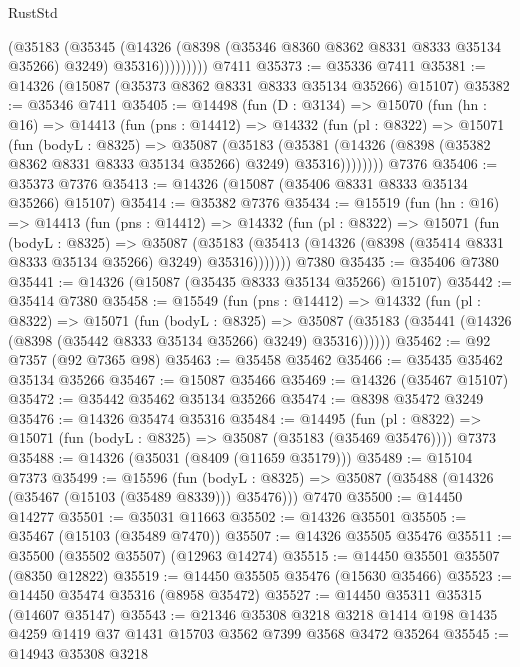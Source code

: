 \begin{lexlean}{RustStd}
\begin{coremodule}
                (@35183
                  (@35345
                    (@14326
                      (@8398 (@35346 @8360 @8362 @8331 @8333 @35134 @35266) @3249)
                      @35316)))))))))
    @7411
@35373 := @35336 @7411
@35381 := @14326 (@15087 (@35373 @8362 @8331 @8333 @35134 @35266) @15107)
@35382 := @35346 @7411
@35405 := @14498
    (fun (D : @3134) =>
    @15070
      (fun (hn : @16) =>
      @14413
        (fun (pns : @14412) =>
        @14332
          (fun (pl : @8322) =>
          @15071
            (fun (bodyL : @8325) =>
            @35087
              (@35183
                (@35381
                  (@14326 (@8398 (@35382 @8362 @8331 @8333 @35134 @35266) @3249) @35316))))))))
    @7376
@35406 := @35373 @7376
@35413 := @14326 (@15087 (@35406 @8331 @8333 @35134 @35266) @15107)
@35414 := @35382 @7376
@35434 := @15519
    (fun (hn : @16) =>
    @14413
      (fun (pns : @14412) =>
      @14332
        (fun (pl : @8322) =>
        @15071
          (fun (bodyL : @8325) =>
          @35087
            (@35183 (@35413 (@14326 (@8398 (@35414 @8331 @8333 @35134 @35266) @3249) @35316)))))))
    @7380
@35435 := @35406 @7380
@35441 := @14326 (@15087 (@35435 @8333 @35134 @35266) @15107)
@35442 := @35414 @7380
@35458 := @15549
    (fun (pns : @14412) =>
    @14332
      (fun (pl : @8322) =>
      @15071
        (fun (bodyL : @8325) =>
        @35087 (@35183 (@35441 (@14326 (@8398 (@35442 @8333 @35134 @35266) @3249) @35316))))))
@35462 := @92 @7357 (@92 @7365 @98)
@35463 := @35458 @35462
@35466 := @35435 @35462 @35134 @35266
@35467 := @15087 @35466
@35469 := @14326 (@35467 @15107)
@35472 := @35442 @35462 @35134 @35266
@35474 := @8398 @35472 @3249
@35476 := @14326 @35474 @35316
@35484 := @14495
    (fun (pl : @8322) => @15071 (fun (bodyL : @8325) => @35087 (@35183 (@35469 @35476))))
    @7373
@35488 := @14326 (@35031 (@8409 (@11659 @35179)))
@35489 := @15104 @7373
@35499 := @15596
    (fun (bodyL : @8325) => @35087 (@35488 (@14326 (@35467 (@15103 (@35489 @8339))) @35476)))
    @7470
@35500 := @14450 @14277
@35501 := @35031 @11663
@35502 := @14326 @35501
@35505 := @35467 (@15103 (@35489 @7470))
@35507 := @14326 @35505 @35476
@35511 := @35500 (@35502 @35507) (@12963 @14274)
@35515 := @14450 @35501 @35507 (@8350 @12822)
@35519 := @14450 @35505 @35476 (@15630 @35466)
@35523 := @14450 @35474 @35316 (@8958 @35472)
@35527 := @14450 @35311 @35315 (@14607 @35147)
@35543 := @21346
    @35308
    @3218
    @3218
    @1414
    @198
    @1435
    @4259
    @1419
    @37
    @1431
    @15703
    @3562
    @7399
    @3568
    @3472
    @35264
@35545 := @14943 @35308 @3218

\end{coremodule}
\end{lexlean}
